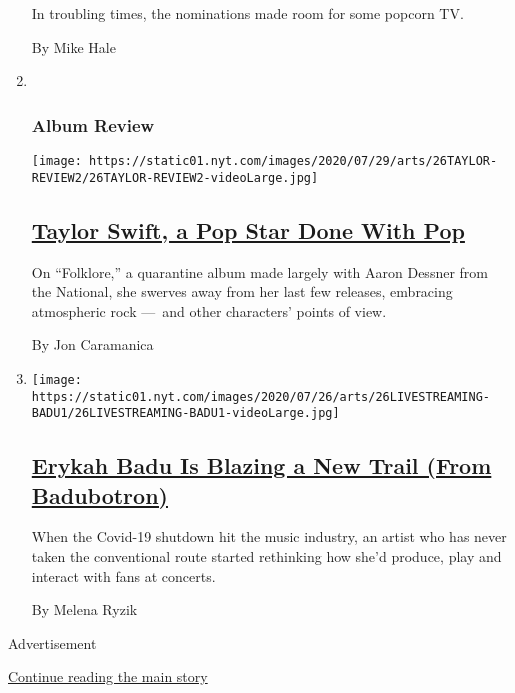 \begin{enumerate}
  In troubling times, the nominations made room for some popcorn TV.

  By Mike Hale
\item ~
  \hypertarget{album-review}{%
  \subsubsection{Album Review}\label{album-review}}

  \texttt{[image: https://static01.nyt.com/images/2020/07/29/arts/26TAYLOR-REVIEW2/26TAYLOR-REVIEW2-videoLarge.jpg]}

  \hypertarget{taylor-swift-a-pop-star-done-with-pop}{%
  \subsection{\texorpdfstring{\href{/2020/07/26/arts/music/taylor-swift-folklore-review.html}{Taylor
  Swift, a Pop Star Done With
  Pop}}{Taylor Swift, a Pop Star Done With Pop}}\label{taylor-swift-a-pop-star-done-with-pop}}

  On ``Folklore,'' a quarantine album made largely with Aaron Dessner
  from the National, she swerves away from her last few releases,
  embracing atmospheric rock ---~and other characters' points of view.

  By Jon Caramanica
\item
  \texttt{[image: https://static01.nyt.com/images/2020/07/26/arts/26LIVESTREAMING-BADU1/26LIVESTREAMING-BADU1-videoLarge.jpg]}

  \hypertarget{erykah-badu-is-blazing-a-new-trail-from-badubotron}{%
  \subsection{\texorpdfstring{\href{/2020/07/21/arts/music/erykah-badu-livestreams.html}{Erykah
  Badu Is Blazing a New Trail (From
  Badubotron)}}{Erykah Badu Is Blazing a New Trail (From Badubotron)}}\label{erykah-badu-is-blazing-a-new-trail-from-badubotron}}

  When the Covid-19 shutdown hit the music industry, an artist who has
  never taken the conventional route started rethinking how she'd
  produce, play and interact with fans at concerts.

  By Melena Ryzik
\end{enumerate}

Advertisement

\protect\hyperlink{after-mid1}{Continue reading the main story}

